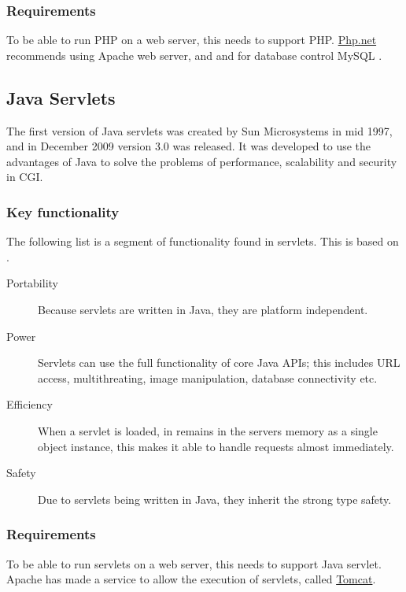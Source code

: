 \subsubsection*{Requirements}

\noindent To be able to run PHP on a web server, this needs to support PHP. \href{http://www.php.net/manual/en/tutorial.requirements.php}{Php.net} recommends using Apache web server, and and for database control MySQL \cite{phpReq}.

\subsection*{Java Servlets}
The first version of Java servlets was created by Sun Microsystems in mid 1997, and in December 2009 version 3.0 was released\cite{servletHistory}. It was developed to use the advantages of Java to solve the problems of performance, scalability and security in CGI\cite{servletHistory2}.

\subsubsection*{Key functionality}

\noindent The following list is a segment of functionality found in servlets. This is based on \cite{servletFunctionality}.

\begin{description}
	\item[Portability] Because servlets are written in Java, they are platform independent.
	\item[Power] Servlets can use the full functionality of core Java APIs; this includes URL access, multithreating, image manipulation, database connectivity etc.
	\item[Efficiency] When a servlet is loaded, in remains in the servers memory as a single object instance, this makes it able to handle requests almost immediately.
	\item[Safety] Due to servlets being written in Java, they inherit the strong type safety.
\end{description}

\subsubsection*{Requirements}

\noindent To be able to run servlets on a web server, this needs to support Java servlet. Apache has made a service to allow the execution of servlets, called \href{http://tomcat.apache.org/}{Tomcat}.



